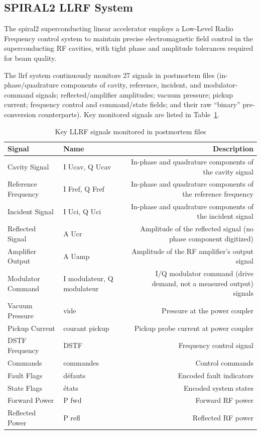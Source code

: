 
\label{sec:system_description}
\subsection{SPIRAL2 LLRF System}

The \gls{spiral2} superconducting linear accelerator employs a Low-Level Radio Frequency control system to maintain precise electromagnetic field control in the superconducting RF cavities, with tight phase and amplitude tolerances required for beam quality.

The \gls{llrf} system continuously monitors 27 signals %
in postmortem files (in-phase/quadrature components of cavity, reference, incident, and modulator-command signals; reflected/amplifier amplitudes; vacuum pressure; pickup current; frequency control and command/state fields; and their raw ``binary'' pre-conversion counterparts). Key monitored signals are listed in Table~\ref{tab:llrf_signals}.

\begin{table}[t]
\centering
\caption{Key LLRF signals monitored in postmortem files}
\label{tab:llrf_signals}
\begin{tabular*}{\linewidth}{@{\extracolsep{\fill}}@{}l l@{} r@{}}
\toprule
\textbf{Signal} & \textbf{Name} & \textbf{Description} \\
\midrule
Cavity Signal & I Ucav, Q Ucav & In-phase and quadrature components of the cavity signal\\
Reference Frequency & I Fref, Q Fref & In-phase and quadrature components of the reference frequency \\
Incident Signal & I Uci, Q Uci & In-phase and quadrature components of the incident signal \\
Reflected Signal & A Ucr & Amplitude of the reflected signal (no phase component digitized) \\
Amplifier Output & A Uamp & Amplitude of the RF amplifier's output signal \\
Modulator Command & I modulateur, Q modulateur & I/Q modulator command (drive demand, not a measured output) signals \\
Vacuum Pressure & vide & Pressure at the power coupler \\
Pickup Current & courant pickup & Pickup probe current at power coupler \\
DSTF Frequency & DSTF & Frequency control signal \\
Commands & commandes  &Control commands \\
Fault Flags & d\'efauts & Encoded fault indicators \\
State Flags & \'etats & Encoded system states \\
Forward Power & P fwd & Forward RF power \\
Reflected Power & P refl & Reflected RF power \\
\bottomrule
\end{tabular*}
\end{table}

